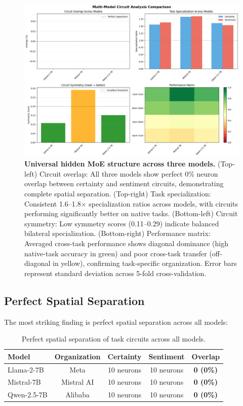 \documentclass{article}
\begin{document}
\begin{figure}[t]
\centering
\includegraphics[width=\textwidth]{./figures/multi_model_comparison.png}
\caption{\textbf{Universal hidden MoE structure across three models.} (Top-left) Circuit overlap: All three models show perfect 0\% neuron overlap between certainty and sentiment circuits, demonstrating complete spatial separation. (Top-right) Task specialization: Consistent 1.6--1.8$\times$ specialization ratios across models, with circuits performing significantly better on native tasks. (Bottom-left) Circuit symmetry: Low symmetry scores (0.11--0.29) indicate balanced bilateral specialization. (Bottom-right) Performance matrix: Averaged cross-task performance shows diagonal dominance (high native-task accuracy in green) and poor cross-task transfer (off-diagonal in yellow), confirming task-specific organization. Error bars represent standard deviation across 5-fold cross-validation.}
\label{fig:multimodel}
\end{figure}

\subsection{Perfect Spatial Separation}

The most striking finding is perfect spatial separation across all models:

\begin{table}[h]
\centering
\begin{tabular}{@{}lcccc@{}}
\toprule
\textbf{Model} & \textbf{Organization} & \textbf{Certainty} & \textbf{Sentiment} & \textbf{Overlap} \\ 
\midrule
Llama-2-7B & Meta & 10 neurons & 10 neurons & \textbf{0 (0\%)} \\
Mistral-7B & Mistral AI & 10 neurons & 10 neurons & \textbf{0 (0\%)} \\
Qwen-2.5-7B & Alibaba & 10 neurons & 10 neurons & \textbf{0 (0\%)} \\
\bottomrule
\end{tabular}
\caption{Perfect spatial separation of task circuits across all models.}
\label{tab:overlap}
\end{table}
\end{document}
